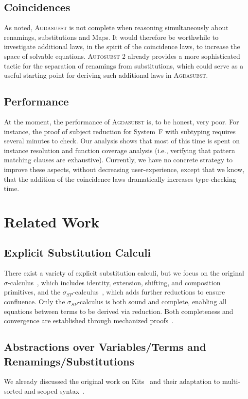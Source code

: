 \documentclass[screen,nonacm]{acmart}
\begin{document}
\subsection*{Coincidences}
As noted, \textsc{Agdasubst} is not complete when reasoning simultaneously
about renamings, substitutions and Maps. It would therefore be worthwhile to
investigate additional laws, in the spirit of the coincidence laws, to increase
the space of solvable equations. \textsc{Autosubst 2} already provides a more
sophisticated tactic for the separation of renamings from substitutions, which
could serve as a useful starting point for deriving such additional laws in
\textsc{Agdasubst}.

\subsection*{Performance}
At the moment, the performance of \textsc{Agdasubst} is, to be honest, very
poor. For instance, the proof of subject reduction for System~F with subtyping
requires several minutes to check. Our analysis shows that most of this time is
spent on instance resolution and function coverage analysis (i.e., verifying
that pattern matching clauses are exhaustive). Currently, we have no concrete
strategy to improve these aspects, without decreasing user-experience, except
that we know, that the addition of the coincidence laws dramatically increases
type-checking time.

\section{Related Work}\label{sec:rwk}

\subsection*{Explicit Substitution Calculi}
There exist a variety of explicit substitution calculi, but we focus on the
original $σ$-calculus~\cite{10.1145/96709.96712}, which includes identity,
extension, shifting, and composition primitives, and the
$σ_{SP}$-calculus~\cite{10.1145/2676724.2693163}, which adds further reductions
to ensure confluence. Only the $σ_{SP}$-calculus is both sound and complete,
enabling all equations between terms to be derived via reduction. Both
completeness and convergence are established through mechanized
proofs~\cite{10.1145/2676724.2693163, Stark:2020:Mechanising}.

\subsection*{Abstractions over Variables/Terms and Renamings/Substitutions}
We already discussed the original work on Kits~\cite{ren-sub} and their
adaptation to multi-sorted and scoped
syntax~\cite{saffrich:LIPIcs.ITP.2024.32}.
\end{document}
